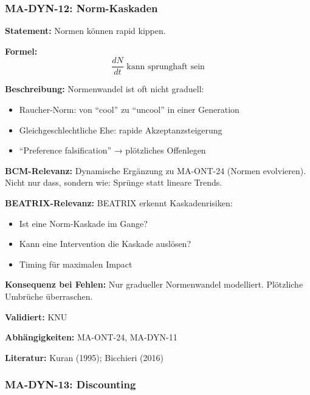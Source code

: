 
\subsubsection*{MA-DYN-12: Norm-Kaskaden}

\textbf{Statement:} Normen können rapid kippen.

\textbf{Formel:}
\begin{equation}
\frac{dN}{dt} \text{ kann sprunghaft sein}
\end{equation}

\textbf{Beschreibung:}
Normenwandel ist oft nicht graduell:
\begin{itemize}
    \item Raucher-Norm: von ``cool'' zu ``uncool'' in einer Generation
    \item Gleichgeschlechtliche Ehe: rapide Akzeptanzsteigerung
    \item ``Preference falsification'' → plötzliches Offenlegen
\end{itemize}

\textbf{BCM-Relevanz:}
Dynamische Ergänzung zu MA-ONT-24 (Normen evolvieren). Nicht nur dass, sondern wie: Sprünge statt lineare Trends.

\textbf{BEATRIX-Relevanz:}
BEATRIX erkennt Kaskadenrisiken:
\begin{itemize}
    \item Ist eine Norm-Kaskade im Gange?
    \item Kann eine Intervention die Kaskade auslösen?
    \item Timing für maximalen Impact
\end{itemize}

\textbf{Konsequenz bei Fehlen:}
Nur gradueller Normenwandel modelliert. Plötzliche Umbrüche überraschen.

\textbf{Validiert:} KNU

\textbf{Abhängigkeiten:} MA-ONT-24, MA-DYN-11

\textbf{Literatur:} Kuran (1995); Bicchieri (2016)


\subsubsection*{MA-DYN-13: Discounting}

